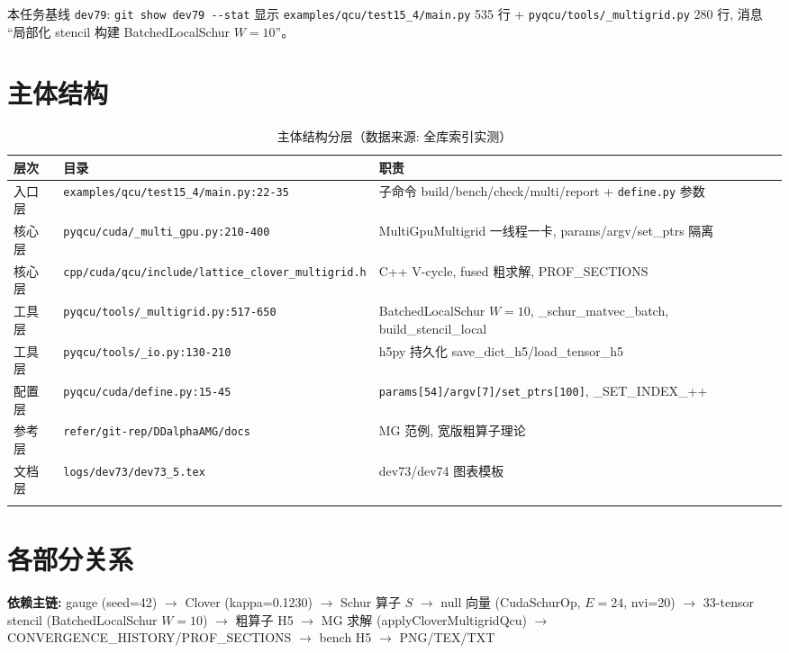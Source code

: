 \documentclass[UTF8]{ctexart}
\begin{document}
\noindent 本任务基线 \texttt{\nolinkurl{dev79}}: \texttt{\nolinkurl{git show dev79 --stat}} 显示 \texttt{\nolinkurl{examples/qcu/test15_4/main.py}} 535 行 + \texttt{\nolinkurl{pyqcu/tools/_multigrid.py}} 280 行, 消息 ``局部化 stencil 构建 BatchedLocalSchur $W=10$''。

\section{主体结构}
\begin{xltabular}{\textwidth}{llX}
\toprule
\textcolor{struct}{层次} & 目录 & \textcolor{struct}{职责} \\
\midrule
\endhead
入口层 & \texttt{\nolinkurl{examples/qcu/test15_4/main.py:22-35}} & 子命令 build/bench/check/multi/report + \texttt{\nolinkurl{define.py}} 参数 \\
核心层 & \texttt{\nolinkurl{pyqcu/cuda/_multi_gpu.py:210-400}} & MultiGpuMultigrid 一线程一卡, params/argv/set\_ptrs 隔离 \\
核心层 & \texttt{\nolinkurl{cpp/cuda/qcu/include/lattice_clover_multigrid.h}} & C++ V-cycle, fused 粗求解, PROF\_SECTIONS \\
工具层 & \texttt{\nolinkurl{pyqcu/tools/_multigrid.py:517-650}} & BatchedLocalSchur $W=10$, \_schur\_matvec\_batch, build\_stencil\_local \\
工具层 & \texttt{\nolinkurl{pyqcu/tools/_io.py:130-210}} & h5py 持久化 save\_dict\_h5/load\_tensor\_h5 \\
配置层 & \texttt{\nolinkurl{pyqcu/cuda/define.py:15-45}} & \texttt{\nolinkurl{params[54]/argv[7]/set_ptrs[100]}}, \_SET\_INDEX\_++ \\
参考层 & \texttt{\nolinkurl{refer/git-rep/DDalphaAMG/docs}} & MG 范例, 宽版粗算子理论 \\
文档层 & \texttt{\nolinkurl{logs/dev73/dev73_5.tex}} & dev73/dev74 图表模板 \\
\bottomrule
\caption{主体结构分层（数据来源: 全库索引实测）}
\end{xltabular}

\section{各部分关系}
\begin{keybox}
\textbf{依赖主链:} \textcolor{relation}{gauge (seed=42) $\to$ Clover (kappa=0.1230) $\to$ Schur 算子 $S$ $\to$ null 向量 (CudaSchurOp, $E=24$, nvi=20) $\to$ 33-tensor stencil (BatchedLocalSchur $W=10$) $\to$ 粗算子 H5 $\to$ MG 求解 (applyCloverMultigridQcu) $\to$ CONVERGENCE\_HISTORY/PROF\_SECTIONS $\to$ bench H5 $\to$ PNG/TEX/TXT}
\end{keybox}
\end{document}
